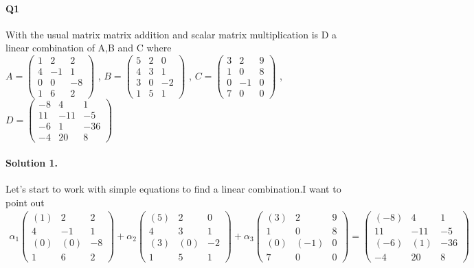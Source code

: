 \documentclass[11pt]{article}
\begin{document}
\pagestyle{myheadings}

\paragraph{Q1}With the usual matrix matrix addition and scalar matrix multiplication is D a linear combination of A,B and C where
\\
$
A=
\begin{pmatrix}
1& 2 & 2\\
4& -1 & 1\\
0& 0 & -8\\
1& 6 & 2
\end{pmatrix}
$
,
$
B=
\begin{pmatrix}
5& 2 & 0\\
4& 3 & 1\\
3& 0 & -2\\
1& 5 & 1
\end{pmatrix}
$
,
$
C=
\begin{pmatrix}
3& 2 & 9\\
1& 0& 8\\
0& -1 & 0\\
7& 0 & 0
\end{pmatrix}
$
,
$
D=
\begin{pmatrix}
-8& 4& 1\\
11& -11 & -5\\
-6& 1 & -36\\
-4& 20& 8
\end{pmatrix}
$

\paragraph{Solution 1.}Let's start to work with simple equations to find a linear combination.I want to point out
\begin{eqnarray*}
\alpha_1
\begin{pmatrix}
(1)& 2 & 2\\
4& -1 & 1\\
(0)& (0) & -8\\
1& 6 & 2
\end{pmatrix} 
+
\alpha_2
\begin{pmatrix}
(5)& 2 & 0\\
4& 3 & 1\\
(3)& (0) & -2\\
1& 5 & 1
\end{pmatrix} 
+
\alpha_3
\begin{pmatrix}
(3)& 2 & 9\\
1& 0& 8\\
(0)& (-1) & 0\\
7& 0 & 0
\end{pmatrix}
=
\begin{pmatrix}
(-8)& 4& 1\\
11& -11 & -5\\
(-6)& (1) & -36\\
-4& 20& 8
\end{pmatrix}
\end{eqnarray*}
\end{document}
